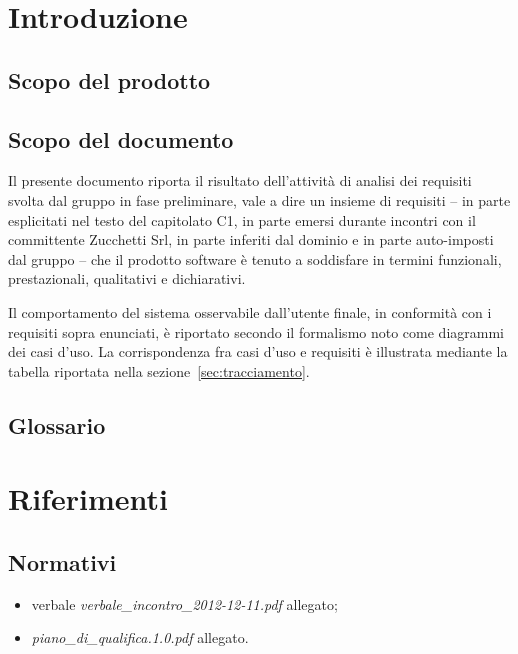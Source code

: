 

\setcounter{page}{1}
\pagestyle{normal}


\section{Introduzione}
\subsection{Scopo del prodotto}
\purpose

\subsection{Scopo del documento}
Il presente documento riporta il risultato dell'attività di analisi dei requisiti svolta dal gruppo \team{} in fase preliminare, vale a dire un insieme di requisiti -- in parte esplicitati nel testo del capitolato C1, in parte emersi durante incontri con il committente Zucchetti Srl, in parte inferiti dal dominio e in parte auto-imposti dal gruppo -- che il prodotto software è tenuto a soddisfare in termini funzionali, prestazionali, qualitativi e dichiarativi.

Il comportamento del sistema osservabile dall'utente finale, in conformità con i requisiti sopra enunciati, è riportato secondo il formalismo noto come diagrammi dei casi d'uso. La corrispondenza fra casi d'uso e requisiti è illustrata mediante la tabella riportata nella sezione~\ref{sec:tracciamento}.

\subsection{Glossario}
\glossaryIntro

\clearpage
\section{Riferimenti}

\subsection{Normativi}
\begin{itemize}
\item[] verbale \textit{verbale\_incontro\_2012-12-11.pdf} allegato;
\item[] \textit{piano\_di\_qualifica.1.0.pdf} allegato.
\end{itemize}

